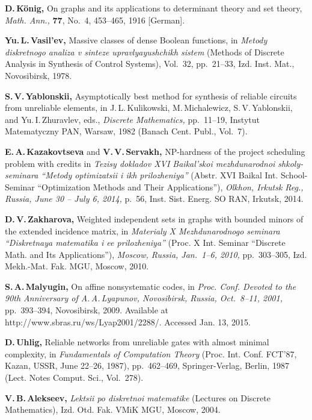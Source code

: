 \documentclass[10pt]{article}
\begin{document}
\begin{thebibliography}{99}
\textbf{D.\,K\"{o}nig,} On graphs and its applications to determinant theory and set theory, 
\textit{Math. Ann.,} \textbf{77}, No.~4, 453--465, 1916 [German].

\textbf{Yu.\,L.\,Vasil’ev,} Massive classes of dense Boolean functions, 
in \textit{Metody diskretnogo analiza v sinteze upravlyayushchikh sistem} 
(Methods of Discrete Analysis in Synthesis of Control Systems), Vol.~32, pp.~21--33, 
Izd. Inst. Mat., Novosibirsk, 1978.

\textbf{S.\,V.\,Yablonskii,} Asymptotically best method for synthesis of reliable circuits from unreliable elements, 
in J.\,L.\,Kulikowski, M.\,Michalewicz, S.\,V.\,Yablonskii, and Yu.\,I.\,Zhuravlev, eds., \textit{Discrete Mathematics,} 
pp.~11--19, Instytut Matematyczny PAN, Warsaw, 1982 (Banach Cent. Publ., Vol.~7).

\textbf{E.\,A.\,Kazakovtseva} and \textbf{V.\,V.\,Servakh,} 
NP-hardness of the project scheduling problem with credits 
in \textit{Tezisy dokladov XVI Baikal'skoi mezhdunarodnoi shkoly-seminara ``Metody optimizatsii i ikh prilozheniya''} 
(Abstr. XVI Baikal Int. School-Seminar ``Optimization Methods and Their Applications''), 
\textit{Olkhon, Irkutsk Reg., Russia, June 30 -- July 6, 2014,} p.~56, Inst. Sist. Energ. SO RAN, Irkutsk, 2014.

\textbf{D.\,V.\,Zakharova,} 
Weighted independent sets in graphs with bounded minors of the extended incidence matrix, 
in \textit{Materialy X Mezhdunarodnogo seminara ``Diskretnaya matematika i ee prilozheniya''} 
(Proc. X Int. Seminar ``Discrete Math. and Its Applications''), 
\textit{Moscow, Russia, Jan.~1--6, 2010,} pp.~303--305, Izd. Mekh.-Mat. Fak. MGU, Moscow, 2010.

\textbf{S.\,A.\,Malyugin,} On affine nonsystematic codes, in \textit{Proc. Conf. Devoted 
to the 90th Anniversary of A.\,A.\,Lyapunov, Novosibirsk, Russia, Oct.~8--11, 2001,} pp.~393--394, 
Novosibirsk, 2009. Available at http://www.sbras.ru/ws/Lyap2001/2288/. Accessed Jan. 13, 2015.

\textbf{D.\,Uhlig,} Reliable networks from unreliable gates with almost minimal complexity, 
in \textit{Fundamentals of Computation Theory} (Proc. Int. Conf. FCT’87, Kazan, USSR, June 22--26, 1987), 
pp.~462--469, Springer-Verlag, Berlin, 1987 (Lect. Notes Comput. Sci., Vol.~278).

\textbf{V.\,B.\,Alekseev,} \textit{Lektsii po diskretnoi matematike} (Lectures on Discrete Mathematics), 
Izd. Otd. Fak. VMiK MGU, Moscow, 2004.


\end{thebibliography}
\end{document}
